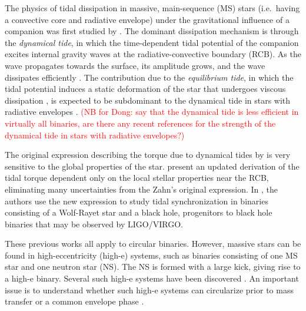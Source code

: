 \documentclass[
        fleqn,
        usenatbib,
    ]{mnras}
\begin{document}

The physics of tidal dissipation in massive, main-sequence (MS) stars (i.e.\
having a convective core and radiative envelope) under the gravitational
influence of a companion was first studied by \citet{zahn1975dynamical}
\citep[see also][]{savonije1983tidal, goldreich1989tidal}. The dominant
dissipation mechanism is through the \emph{dynamical tide}, in which the
time-dependent tidal potential of the companion excites internal gravity waves
at the radiative-convective boundary (RCB). As the wave propagates towards the
surface, its amplitude grows, and the wave dissipates efficiently
\citep{zahn1975dynamical, goldreich1989tidal, su2020}. The contribution due to
the \emph{equilibrium tide}, in which the tidal potential induces a static
deformation of the star that undergoes viscous dissipation \citep[see
e.g.][]{alexander73, hut81}, is expected to be subdominant to the dynamical tide
in stars with radiative envelopes \citep{zahn1977tidal, goldreich1989tidal}.
\textcolor{red}{(NB for Dong: \citet{vigna2020common} say that the dynamical
tide is less efficient in virtually all binaries, are there any recent
references for the strength of the dynamical tide in stars with radiative
envelopes?)}

The original expression describing the torque due to dynamical tides by
\citet{zahn1975dynamical} is very sensitive to the global properties of the
star. \citet{kushnir} present an updated derivation of the tidal torque
dependent only on the local stellar properties near the RCB, eliminating many
uncertainties from the Zahn's original expression. In
\citet{zaldarriaga2018expected}, the authors use the new expression to study
tidal synchronization in binaries consisting of a Wolf-Rayet star and a black
hole, progenitors to black hole binaries that may be observed by LIGO/VIRGO\@.

These previous works all apply to circular binaries. However, massive stars can
be found in high-eccentricity (high-e) systems, such as binaries consisting of
one MS star and one neutron star (NS). The NS is formed with a large kick,
giving rise to a high-e binary. Several such high-e systems have been discovered
\citep[e.g.][]{johnston1994radio, bell1995psr, champion2008eccentric}. An
important issue is to understand whether such high-e systems can circularize
prior to mass transfer or a common envelope phase \citep{vigna2020common}.
\end{document}
